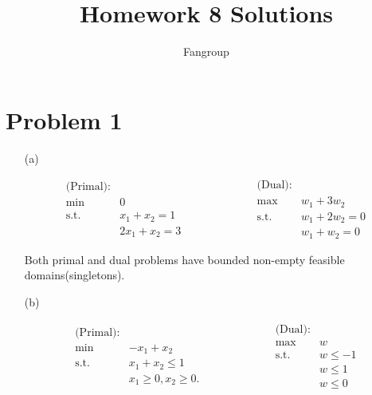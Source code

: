 \documentclass[12pt]{article}
\begin{document}
 
 
\title{Homework 8 Solutions}
\author{Fangroup}
\maketitle

\section*{Problem 1}

\begin{enumerate}
\item [(a)]

\begin{equation*}
\begin{array}{rl}
\text{(Primal):} & \\
\min & 0 \\\text{s.t.} & x_1 + x_2 =1 \\
& 2x_1 + x_2 = 3
\end{array} \qquad \qquad \qquad
\begin{array}{rl}
\text{(Dual):} & \\
\max & w_1 + 3w_2 \\
\text{s.t.} & w_1 + 2w_2 = 0 \\
& w_1 + w_2 = 0
\end{array}
\end{equation*}

Both primal and dual problems have bounded non-empty feasible domains(singletons).

\item [(b)]

\begin{equation*}
\begin{array}{rl}
\text{(Primal):} & \\
\min & -x_1 + x_2 \\\text{s.t.} & x_1 + x_2 \leqslant 1 \\
& x_1 \geqslant 0, x_2 \geqslant 0.
\end{array} \qquad \qquad \qquad
\begin{array}{rl}
\text{(Dual):} & \\
\max & w \\
\text{s.t.} & w \leqslant -1 \\
& w \leqslant 1 \\
& w \leqslant 0
\end{array}
\end{equation*}


\end{enumerate}
\end{document}
